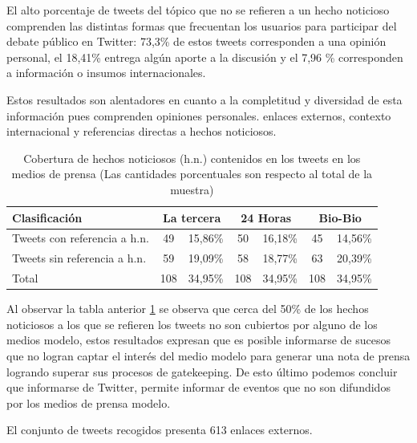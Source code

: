 El alto porcentaje de tweets del tópico que no se refieren a un hecho noticioso comprenden las distintas formas que frecuentan los usuarios para participar del debate público en Twitter: 73,3\% de estos tweets corresponden a una opinión personal, el 18,41\% entrega algún aporte a la discusión y el 7,96 \% corresponden a información o insumos internacionales.  

Estos resultados son alentadores en cuanto a la completitud y diversidad de esta información pues comprenden opiniones personales. enlaces externos, contexto internacional y referencias directas a hechos noticiosos. 

\begin{table}[H]
	\centering
	\begin{tabular}{| l | c | c | c | c | c | c |}
		\hline
		Clasificación    & \multicolumn{2}{c|}{La tercera} & \multicolumn{2}{c}{24 Horas} & \multicolumn{2}{|c|}{Bio-Bio} \\ \hline
		 
		Tweets con referencia a h.n.    & 49 & 15,86\% & 50 & 16,18\% & 45 & 14,56\% \\ \hline
		Tweets sin referencia a h.n. & 59 & 19,09\% & 58 & 18,77\% & 63 & 20,39\%  \\ \hline
		Total & 108 & 34,95\% & 108 & 34,95\% & 108 & 34,95\%  \\ \hline
	\end{tabular}
	\caption {Cobertura de hechos noticiosos (h.n.) contenidos en los tweets en los medios de prensa (Las cantidades porcentuales son respecto al total de la muestra)}
	\label{coberturaMediosModelo}
\end{table}

Al observar la tabla anterior \ref{coberturaMediosModelo} se observa que cerca del 50\% de los hechos noticiosos a los que se refieren los tweets no son cubiertos por alguno de los medios modelo, estos resultados expresan que es posible informarse de sucesos que no logran captar el interés del medio modelo para generar una nota de prensa logrando superar sus procesos de gatekeeping. De esto último podemos concluir que informarse de Twitter, permite informar de eventos que no son difundidos por los medios de prensa modelo.

El conjunto de tweets recogidos presenta 613 enlaces externos.


